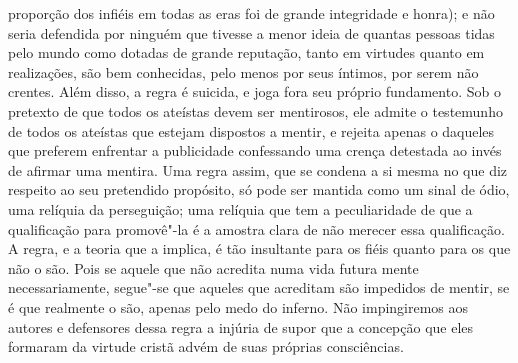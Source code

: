 proporção dos infiéis em todas as eras foi de grande
integridade e honra); e não seria defendida por ninguém que tivesse a
menor ideia de quantas pessoas tidas pelo mundo como dotadas de grande
reputação, tanto em virtudes quanto em realizações, são bem
conhecidas, pelo menos por seus íntimos, por serem não crentes. Além
disso, a regra é suicida, e joga fora seu próprio fundamento. Sob o
pretexto de que todos os ateístas devem ser mentirosos, ele admite o
testemunho de todos os ateístas que estejam dispostos a mentir, e
rejeita apenas o daqueles que preferem enfrentar a publicidade
confessando uma crença detestada ao invés de afirmar uma mentira. Uma
regra assim, que se condena a si mesma no que diz respeito ao seu
pretendido propósito, só pode ser mantida como um sinal de ódio, uma
relíquia da perseguição; uma relíquia que tem a peculiaridade de que a
qualificação para promovê"-la é a amostra clara de não merecer essa
qualificação. A regra, e a teoria que a implica, é tão insultante para
os fiéis quanto para os que não o são. Pois se aquele que não acredita
numa vida futura mente necessariamente, segue"-se que aqueles que
acreditam são impedidos de mentir, se é que realmente o são,
apenas pelo medo do inferno. Não impingiremos aos autores e defensores
dessa regra a injúria de supor que a concepção que eles formaram da
virtude cristã advém de suas próprias consciências. 

